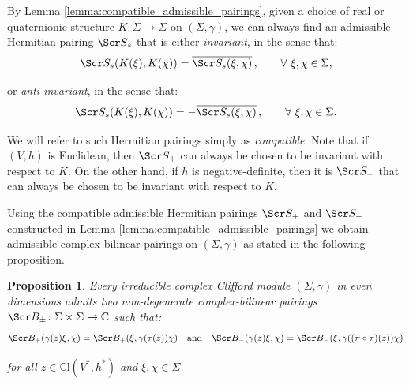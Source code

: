 \documentclass[10pt,a4paper,twoside,reqno]{amsart}
\theoremstyle{plain}
\newtheorem{prop}[thm]{Proposition}
\theoremstyle{definition}
\theoremstyle{remark}
\def\C{\mathbb{C}}
\def\scB{\Scr B}
\def\scS{\Scr S}
\begin{document}
\noindent
By Lemma \ref{lemma:compatible_admissible_pairings}, given a choice of real or quaternionic structure $K\colon \Sigma\to \Sigma$ on $(\Sigma,\gamma)$, we can always find an admissible Hermitian pairing $\scS_s$ that is either \emph{invariant}, in the sense that:
\begin{equation*}
\scS_s(K(\xi),K(\chi))=\overline{\scS_s(\xi,\chi)}  \, , \qquad \forall\,\, \xi, \chi \in \Sigma,
\end{equation*}

\noindent
or \emph{anti-invariant}, in the sense that:
\begin{equation*}
\scS_s(K(\xi),K(\chi))= - \overline{\scS_s(\xi,\chi)}  \, , \qquad \forall\,\, \xi, \chi \in \Sigma.
\end{equation*}

\noindent
We will refer to such Hermitian pairings simply as \emph{compatible}. Note that if $(V,h)$ is Euclidean, then $\scS_{+}$ can always be chosen to be invariant with respect to $K$. On the other hand, if $h$ is negative-definite, then it is $\scS_{-}$ that can always be chosen to be invariant with respect to $K$.\medskip

\noindent
Using the compatible admissible Hermitian pairings $\scS_{+}$ and $\scS_{-}$ constructed in Lemma \ref{lemma:compatible_admissible_pairings} we obtain admissible complex-bilinear pairings on $(\Sigma,\gamma)$ as stated in the following proposition.

\begin{prop}
\label{prop:complex_bilinear_admissible}
Every irreducible complex Clifford module $(\Sigma,\gamma)$ in even dimensions admits two non-degenerate complex-bilinear pairings $\scB_{\pm} \colon \Sigma \times \Sigma \to\C$ such that:
\begin{equation}
\label{eq:complex_bilinear_admissible_Bs}
\scB_+(\gamma(z)\xi,\chi)=\scB_+(\xi,\gamma(\tau(z))\chi)\quad\text{and}\quad\scB_-(\gamma(z)\xi,\chi)=\scB_-(\xi,\gamma((\pi\circ\tau)(z))\chi)
\end{equation} 

\noindent
for all $z\in\C\mathrm{l}(V^*,h^*)$ and $\xi,\chi\in\Sigma$. 
\end{prop}
\end{document}
